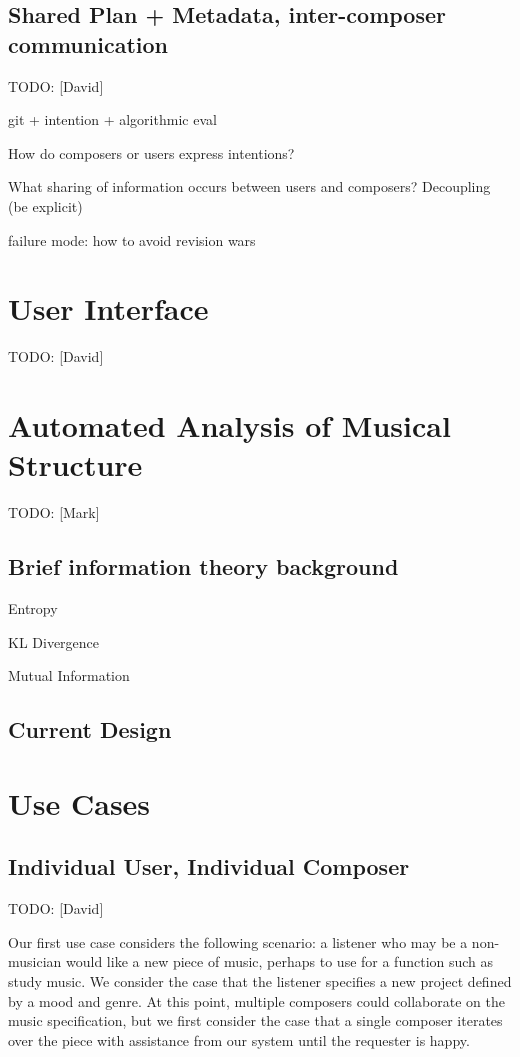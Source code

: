 \documentclass[final,authoryear,11pt,times]{elsarticle}
\begin{document}
\subsection{Shared Plan + Metadata, inter-composer communication}

TODO: [David]

git + intention + algorithmic eval

How do composers or users express intentions?

What sharing of information occurs between users and composers? Decoupling (be explicit)

failure mode: how to avoid revision wars

\section{User Interface}

TODO: [David]








\section{Automated Analysis of Musical Structure}

TODO: [Mark]

\subsection{Brief information theory background}

Entropy

KL Divergence

Mutual Information

\subsection{Current Design}


\section{Use Cases}

\subsection{Individual User, Individual Composer}

TODO: [David]

Our first use case considers the following scenario: a listener who may be a non-musician would like a new piece of music, perhaps to use for a function such as study music. We consider the case that the listener specifies a new project defined by a mood and genre. At this point, multiple composers could collaborate on the music specification, but we first consider the case that a single composer iterates over the piece with assistance from our system until the requester is happy.
\end{document}
